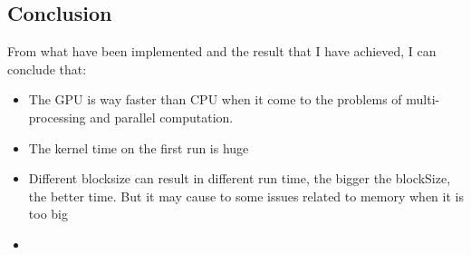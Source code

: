 \documentclass[12pt,a4paper]{cibb}
\begin{document}
\subsection{Conclusion}
From what have been implemented and the result that I have achieved, I can conclude that:
\begin{itemize}
    \item The GPU is way faster than CPU when it come to the problems of multi-processing and parallel computation.
    \item The kernel time on the first run is huge
    \item Different blocksize can result in different run time, the bigger the blockSize, the better time. But it may cause to some issues related to memory when it is too big
    
\end{itemize}
\begin{itemize}
    \item 
\end{itemize}
\normalsize
\end{document}
